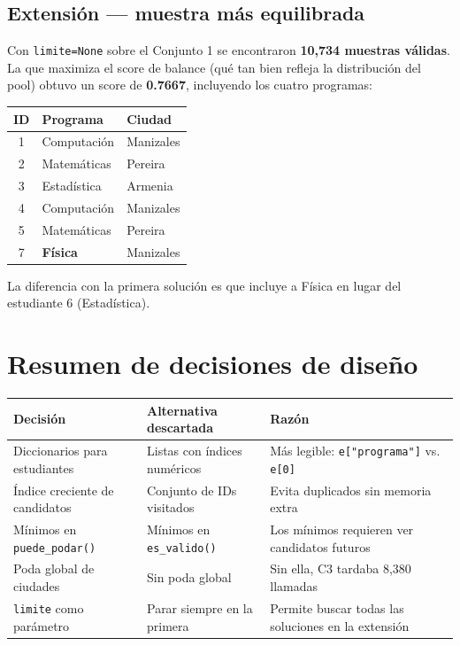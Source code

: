 \documentclass[11pt, a4paper]{article}
\begin{document}
\subsection{Extensión — muestra más equilibrada}

Con \texttt{limite=None} sobre el Conjunto 1 se encontraron \textbf{10,734 muestras válidas}. La que maximiza el score de balance (qué tan bien refleja la distribución del pool) obtuvo un score de \textbf{0.7667}, incluyendo los cuatro programas:

\begin{center}
\begin{tabular}{cll}
  \toprule
  \textbf{ID} & \textbf{Programa} & \textbf{Ciudad} \\
  \midrule
  1 & Computación & Manizales \\
  2 & Matemáticas & Pereira \\
  3 & Estadística & Armenia \\
  4 & Computación & Manizales \\
  5 & Matemáticas & Pereira \\
  7 & \textbf{Física}       & Manizales \\
  \bottomrule
\end{tabular}
\end{center}

La diferencia con la primera solución es que incluye a Física en lugar del estudiante 6 (Estadística).

\section{Resumen de decisiones de diseño}

\begin{center}
\begin{tabular}{p{4cm}p{4.5cm}p{5cm}}
  \toprule
  \textbf{Decisión} & \textbf{Alternativa descartada} & \textbf{Razón} \\
  \midrule
  Diccionarios para estudiantes & Listas con índices numéricos & Más legible: \texttt{e["programa"]} vs. \texttt{e[0]} \\
  Índice creciente de candidatos & Conjunto de IDs visitados & Evita duplicados sin memoria extra \\
  Mínimos en \texttt{puede\_podar()} & Mínimos en \texttt{es\_valido()} & Los mínimos requieren ver candidatos futuros \\
  Poda global de ciudades & Sin poda global & Sin ella, C3 tardaba 8,380 llamadas \\
  \texttt{limite} como parámetro & Parar siempre en la primera & Permite buscar todas las soluciones en la extensión \\
  \bottomrule
\end{tabular}
\end{center}
\end{document}
